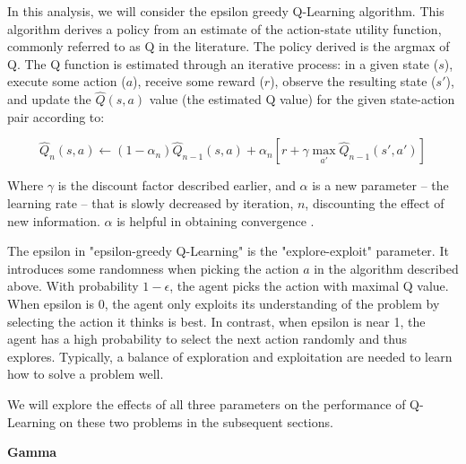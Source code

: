 \documentclass{article}
\begin{document}
In this analysis, we will consider the epsilon greedy Q-Learning algorithm. This algorithm derives a policy from an estimate
of the action-state utility function, commonly referred to as Q in the literature. The policy derived is the argmax of Q. The Q
function is estimated through an iterative process: in a given state ($s$), execute some action ($a$), receive some reward ($r$),
observe the resulting state ($s'$), and update the $\hat{Q}(s,a)$ value (the estimated Q value) for the given state-action pair
according to:

\begin{equation*}
    \hat{Q}_{n}(s,a) \leftarrow (1 - \alpha_{n})\hat{Q}_{n-1}(s,a) + \alpha_{n}[r + \gamma\max_{a'} \hat{Q}_{n-1}(s', a')]
\end{equation*}

Where $\gamma$ is the discount factor described earlier, and $\alpha$ is a new parameter -- the learning rate -- that is slowly
decreased by iteration, $n$, discounting the effect of new information. $\alpha$ is helpful in obtaining convergence
\cite{ml_textbook}.

The epsilon in "epsilon-greedy Q-Learning" is the "explore-exploit" parameter. It introduces some randomness when picking the
action $a$ in the algorithm described above. With probability $1 - \epsilon$, the agent picks the action with maximal Q value.
When epsilon is 0, the agent only exploits its understanding of the problem by selecting the action it thinks is best.
In contrast, when epsilon is near 1, the agent has a high probability to select the next action randomly and thus explores.
Typically, a balance of exploration and exploitation are needed to learn how to solve a problem well.

We will explore the effects of all three parameters on the performance of Q-Learning on these two problems in the subsequent
sections.

\textbf{Gamma}
\end{document}
